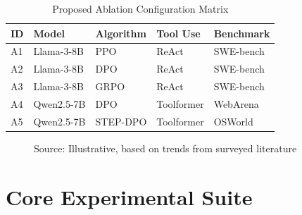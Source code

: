 \documentclass[12pt,a4paper]{report}
\theoremstyle{definition}
\newcommand{\source}[1]{\vspace{-0.5\baselineskip}\caption*{\small Source: #1}}
\begin{document}
\begin{table}[h]
\centering
\caption{Proposed Ablation Configuration Matrix}
\label{tab:ablation}
\begin{tabular}{lllll}
\toprule
\textbf{ID} & \textbf{Model} & \textbf{Algorithm} & \textbf{Tool Use} & \textbf{Benchmark} \\
\midrule
A1 & Llama-3-8B & PPO & ReAct & SWE-bench \\
A2 & Llama-3-8B & DPO & ReAct & SWE-bench \\
A3 & Llama-3-8B & GRPO & ReAct & SWE-bench \\
A4 & Qwen2.5-7B & DPO & Toolformer & WebArena \\
A5 & Qwen2.5-7B & STEP-DPO & Toolformer & OSWorld \\
\bottomrule
\end{tabular}
\end{table}

\begin{figure}[htbp]
\centering
{}
\caption{Illustrative training curves comparing PPO, DPO, and GRPO on agentic benchmarks. Based on trends reported in \cite{deepseek2025r1, rafailov2023direct}, GRPO typically converges faster and reaches higher task success on verifiable tasks because its lighter memory footprint lets practitioners crank up batch sizes.}
\label{fig:algorithm_comparison}
\source{Illustrative, based on trends from surveyed literature}
\end{figure}

\section*{Core Experimental Suite}
\label{sec:comprehensive_experiments}
\end{document}
